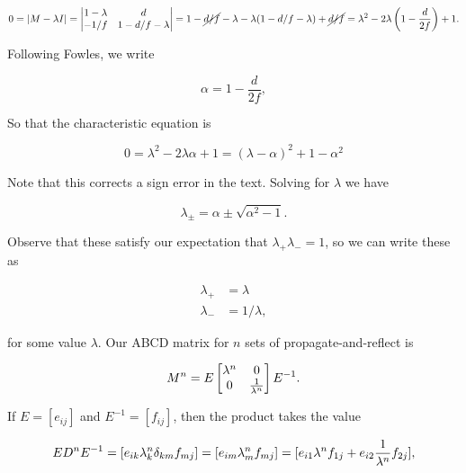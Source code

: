 {\begin{dmath}\label{eqn:problemSet4Problem2:100}
0
= \Abs{ M - \lambda I }
=
\begin{vmatrix}
1 - \lambda & d \\
-1/f & 1 - d/f - \lambda
\end{vmatrix}
=
1 - \cancel{d/f} - \lambda - \lambda( 1 - d/f - \lambda ) + \cancel{d/f}
=
\lambda^2 - 2 \lambda \left( 1 - \frac{d}{2 f} \right) + 1.
\end{dmath}

Following Fowles, we write

\begin{dmath}\label{eqn:problemSet4Problem2:120}
\alpha = 1 - \frac{d}{2 f},
\end{dmath}

So that the characteristic equation is

\begin{dmath}\label{eqn:problemSet4Problem2:140}
0
=
\lambda^2 - 2 \lambda \alpha + 1
=
\left( \lambda - \alpha \right)^2 + 1 - \alpha^2
\end{dmath}

Note that this corrects a sign error in the text.  Solving for $\lambda$ we have

\begin{dmath}\label{eqn:problemSet4Problem2:160}
\lambda_{\pm} = \alpha \pm \sqrt{\alpha^2 - 1}.
\end{dmath}

Observe that these satisfy our expectation that $\lambda_{+} \lambda_{-} = 1$, so we can write these as

\begin{align}\label{eqn:problemSet4Problem2:300}
\lambda_{+} &= \lambda \\
\lambda_{-} &= 1/\lambda,
\end{align}

for some value $\lambda$.  Our ABCD matrix for $n$ sets of propagate-and-reflect is

\begin{dmath}\label{eqn:problemSet4Problem2:260}
M^n = E
\begin{bmatrix}
\lambda^n & 0 \\
0 & \inv{\lambda^n}
\end{bmatrix}
E^{-1}.
\end{dmath}

If $E = [ e_{i j} ]$ and $E^{-1} = [ f_{i j} ]$, then the product takes the value

\begin{dmath}\label{eqn:problemSet4Problem2:280}
E D^n E^{-1}
= [ e_{i k} \lambda_k^n \delta_{k m } f_{m j} ]
= [ e_{i m} \lambda_m^n f_{m j} ]
= [
e_{i 1} \lambda^n f_{1 j}
+
e_{i 2} \inv{\lambda^n} f_{2 j}
],
\end{dmath}

}
